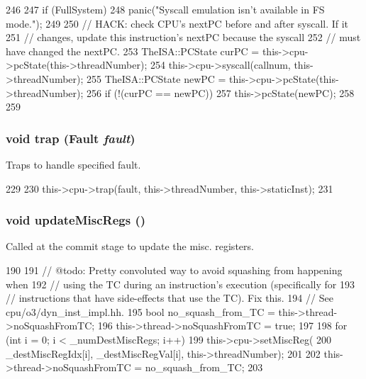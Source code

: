 \begin{DoxyCode}
246 {
247     if (FullSystem)
248         panic("Syscall emulation isn't available in FS mode.\n");
249 
250     // HACK: check CPU's nextPC before and after syscall. If it
251     // changes, update this instruction's nextPC because the syscall
252     // must have changed the nextPC.
253     TheISA::PCState curPC = this->cpu->pcState(this->threadNumber);
254     this->cpu->syscall(callnum, this->threadNumber);
255     TheISA::PCState newPC = this->cpu->pcState(this->threadNumber);
256     if (!(curPC == newPC)) {
257         this->pcState(newPC);
258     }
259 }
\end{DoxyCode}
\hypertarget{classBaseO3DynInst_ac74f75adb89c94e4387498067f5567ff}{
\subsubsection[{trap}]{\setlength{\rightskip}{0pt plus 5cm}void trap ({\bf Fault} {\em fault})}}
\label{classBaseO3DynInst_ac74f75adb89c94e4387498067f5567ff}
Traps to handle specified fault. 


\begin{DoxyCode}
229 {
230     this->cpu->trap(fault, this->threadNumber, this->staticInst);
231 }
\end{DoxyCode}
\hypertarget{classBaseO3DynInst_a56cd11ccc7171772c548bcb4b959ef61}{
\subsubsection[{updateMiscRegs}]{\setlength{\rightskip}{0pt plus 5cm}void updateMiscRegs ()}}
\label{classBaseO3DynInst_a56cd11ccc7171772c548bcb4b959ef61}
Called at the commit stage to update the misc. registers. 


\begin{DoxyCode}
190     {
191         // @todo: Pretty convoluted way to avoid squashing from happening when
192         // using the TC during an instruction's execution (specifically for
193         // instructions that have side-effects that use the TC).  Fix this.
194         // See cpu/o3/dyn_inst_impl.hh.
195         bool no_squash_from_TC = this->thread->noSquashFromTC;
196         this->thread->noSquashFromTC = true;
197 
198         for (int i = 0; i < _numDestMiscRegs; i++)
199             this->cpu->setMiscReg(
200                 _destMiscRegIdx[i], _destMiscRegVal[i], this->threadNumber);
201 
202         this->thread->noSquashFromTC = no_squash_from_TC;
203     }
\end{DoxyCode}


